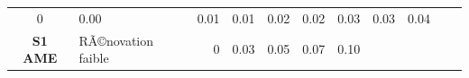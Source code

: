 \documentclass[]{article}
\begin{document}
\begin{longtable}[]{@{}clrrrrrrrrr@{}}
\begin{minipage}[t]{0.05\columnwidth}
0\strut
\end{minipage} & \begin{minipage}[t]{0.05\columnwidth}\raggedleft\strut
0.00\strut
\end{minipage} & \begin{minipage}[t]{0.05\columnwidth}\raggedleft\strut
0.01\strut
\end{minipage} & \begin{minipage}[t]{0.05\columnwidth}\raggedleft\strut
0.01\strut
\end{minipage} & \begin{minipage}[t]{0.05\columnwidth}\raggedleft\strut
0.02\strut
\end{minipage} & \begin{minipage}[t]{0.05\columnwidth}\raggedleft\strut
0.02\strut
\end{minipage} & \begin{minipage}[t]{0.05\columnwidth}\raggedleft\strut
0.03\strut
\end{minipage} & \begin{minipage}[t]{0.05\columnwidth}\raggedleft\strut
0.03\strut
\end{minipage} & \begin{minipage}[t]{0.05\columnwidth}\raggedleft\strut
0.04\strut
\end{minipage}\tabularnewline
\begin{minipage}[t]{0.12\columnwidth}\centering\strut
\textbf{S1 AME}\strut
\end{minipage} & \begin{minipage}[t]{0.17\columnwidth}\raggedright\strut
RÃ©novation faible\strut
\end{minipage} & \begin{minipage}[t]{0.05\columnwidth}\raggedleft\strut
0\strut
\end{minipage} & \begin{minipage}[t]{0.05\columnwidth}\raggedleft\strut
0.03\strut
\end{minipage} & \begin{minipage}[t]{0.05\columnwidth}\raggedleft\strut
0.05\strut
\end{minipage} & \begin{minipage}[t]{0.05\columnwidth}\raggedleft\strut
0.07\strut
\end{minipage} & \begin{minipage}[t]{0.05\columnwidth}\raggedleft\strut
0.10\strut
\end{minipage} & \begin{minipage}[t]{0.05\columnwidth}\raggedleft\strut

\end{minipage}
\end{longtable}
\end{document}

